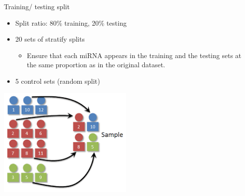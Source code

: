 \documentclass{beamer}
\begin{document}
\begin{frame}{Training/ testing split}
\begin{itemize}
\item Split ratio: 80\% training, 20\% testing
\item 20 sets of stratify splits
\begin{itemize}
\item Ensure that each miRNA appears in the training and the testing sets at the same proportion as in the original dataset.
\end{itemize}
\item 5 control sets (random split)
\end{itemize}
\includegraphics[width=0.5\textwidth,keepaspectratio]{images/stratify.png}
\end{frame}
\end{document}
